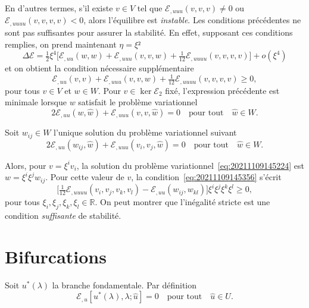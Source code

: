 \documentclass[12pt, final]{amsart}
\begin{document}
En d'autres termes, s'il existe \(v\in V\) tel que \(\mathcal E_{,uuu}(v, v, v)\neq0\) ou
\(\mathcal E_{,uuuu}(v, v, v, v)<0\), alors l'équilibre est \emph{instable}. Les
conditions précédentes ne sont pas suffisantes pour assurer la stabilité. En
effet, supposant ces conditions remplies, on prend maintenant \(\eta =\xi ²\)
\begin{equation}
  \Delta \mathcal E=\tfrac12\xi ^4\bigl[\mathcal E_{,uu}(w, w)+\mathcal E_{,uuu}(v, v, w)
  +\tfrac1{12}\mathcal E_{,uuuu}(v, v, v, v)\bigr]+o(\xi ^4)
\end{equation}
et on obtient la condition nécessaire supplémentaire
\begin{equation}
  \label{eq:20211109145356}
  \mathcal E_{,uu}(v, v)+\mathcal E_{,uuu}(v, v, w)+\tfrac1{12}\mathcal E_{,uuuu}(v, v, v, v)\geq0,
\end{equation}
pour tous \(v\in V\) et \(w\in W\). Pour \(v\in\ker\mathcal E_2\) fixé, l'expression précédente
est minimale lorsque \(w\) satisfait le problème variationnel
\begin{equation}
  \label{eq:20211109145224}
  2\mathcal E_{,uu}(w, \hat{w})+\mathcal E_{,uuu}(v, v, \hat{w})=0\quad\text{pour tout}\quad\hat{w}\in W.
\end{equation}

Soit \(w_{ij}\in W\) l'unique solution du problème variationnel suivant
\begin{equation}
  \label{eq:20211221155859}
  2\mathcal E_{,uu}(w_{ij}, \hat{w})+\mathcal E_{,uuu}(v_i, v_j, \hat{w})=0\quad\text{pour tout}\quad\hat{w}\in W.
\end{equation}

Alors, pour \(v=\xi ^i v_i\), la solution du problème
variationnel~\eqref{eq:20211109145224} est \(w=\xi ^i\xi ^jw_{ij}\). Pour cette
valeur de \(v\), la condition~\eqref{eq:20211109145356} s'écrit
\begin{equation}
  \bigl[\tfrac1{12}\mathcal E_{,uuuu}(v_i, v_j, v_k, v_l)-\mathcal E_{,uu}(w_{ij}, w_{kl})\bigr]\xi ^i\xi ^j\xi ^k\xi ^l\geq0,
\end{equation}
pour tous \(\xi _i, \xi _j, \xi _k, \xi _l\in\mathbb R \). On peut montrer que l'inégalité stricte est
une condition \emph{suffisante} de stabilité.

\section{Bifurcations}

Soit \(u^*(\lambda )\) la branche fondamentale. Par définition
\begin{equation}
  \mathcal E_{,u}[u^*(\lambda ), \lambda ;\hat{u}]=0\quad\text{pour tout}\quad\hat{u}\in U.
\end{equation}
\end{document}
